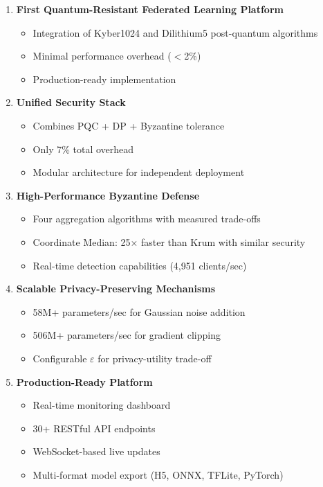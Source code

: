 \documentclass[12pt,a4paper]{article}
\begin{document}
\begin{enumerate}
    \item \textbf{First Quantum-Resistant Federated Learning Platform}
    \begin{itemize}
        \item Integration of Kyber1024 and Dilithium5 post-quantum algorithms
        \item Minimal performance overhead ($<$2\%)
        \item Production-ready implementation
    \end{itemize}
    
    \item \textbf{Unified Security Stack}
    \begin{itemize}
        \item Combines PQC + DP + Byzantine tolerance
        \item Only 7\% total overhead
        \item Modular architecture for independent deployment
    \end{itemize}
    
    \item \textbf{High-Performance Byzantine Defense}
    \begin{itemize}
        \item Four aggregation algorithms with measured trade-offs
        \item Coordinate Median: 25$\times$ faster than Krum with similar security
        \item Real-time detection capabilities (4,951 clients/sec)
    \end{itemize}
    
    \item \textbf{Scalable Privacy-Preserving Mechanisms}
    \begin{itemize}
        \item 58M+ parameters/sec for Gaussian noise addition
        \item 506M+ parameters/sec for gradient clipping
        \item Configurable $\varepsilon$ for privacy-utility trade-off
    \end{itemize}
    
    \item \textbf{Production-Ready Platform}
    \begin{itemize}
        \item Real-time monitoring dashboard
        \item 30+ RESTful API endpoints
        \item WebSocket-based live updates
        \item Multi-format model export (H5, ONNX, TFLite, PyTorch)
    \end{itemize}
\end{enumerate}
\end{document}
